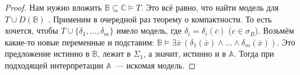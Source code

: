 \begin{proof}
    Нам нужно вложить $\mathbb{B} \subseteq \mathbb{C} \models T$. Это всё равно, что найти модель для  $T \cup D(\mathbb{B})$ . Применим в очередной раз теорему о компактности. То есть хочется, чтобы $T \cup \{\delta_1, \ldots, \delta_m\}$ имело модель, где $\delta_i = \delta_i(\overline{c})$ ($c \in \sigma_B$). Возьмём какие-то новые переменные и подставим: $\mathbb{B} \models \exists \overline{x}\, (\delta_1(\overline{x}) \wedge \ldots \wedge \delta_m(\overline{x}))$. Это предложение истинно в $\mathbb{B}$, лежит в $\Sigma_1$, а значит, истинно и в $\mathbb{A}$. Тогда при подходящей интерпретации $\mathbb{A}$~— искомая модель.
\end{proof}
